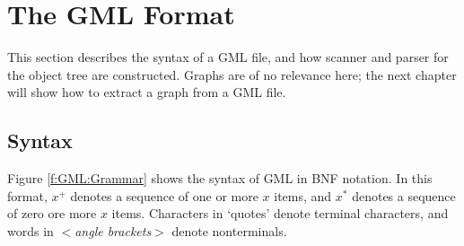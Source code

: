 %

\chapter{The GML Format}

This section describes the syntax of a GML file, and how scanner and 
parser for the object tree are constructed. Graphs are of no 
relevance here; the next chapter will show how to extract a graph 
from a GML file.


%
%

\section{Syntax}

Figure \ref{f:GML:Grammar} shows the syntax of GML in BNF
notation. In this format, $x^{+}$ denotes a sequence of one or
more $x$ items, and $x^{*}$ denotes a sequence of zero ore more $x$
items. Characters in `quotes' denote terminal characters, and words in
$<$\emph{angle brackets}$>$ denote nonterminals.


